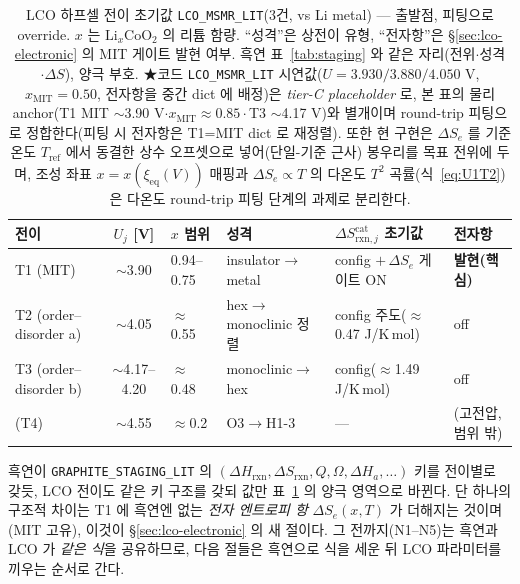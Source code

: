 \documentclass[11pt,a4paper]{article}
\newcommand{\rxn}{\mathrm{rxn}}
\newcommand{\code}[1]{\texttt{#1}}
\begin{document}
\begin{table}[t]
\centering\footnotesize
\renewcommand{\arraystretch}{1.3}
\caption{LCO 하프셀 전이 초기값 \code{LCO\_MSMR\_LIT}(3건, vs Li metal) — 출발점, 피팅으로 override. $x$ 는
$\mathrm{Li}_x\mathrm{CoO_2}$ 의 리튬 함량. ``성격''은 상전이 유형, ``전자항''은 \S\ref{sec:lco-electronic} 의 MIT
게이트 발현 여부. 흑연 표~\ref{tab:staging} 와 같은 자리(전위$\cdot$성격$\cdot\Delta S$), 양극 부호.
★코드 \code{LCO\_MSMR\_LIT} 시연값($U{=}3.930/3.880/4.050$ V, $x_\mathrm{MIT}{=}0.50$, 전자항을 중간 dict 에 배정)은
\emph{tier-C placeholder} 로, 본 표의 물리 anchor(T1 MIT $\sim$3.90 V$\cdot x_\mathrm{MIT}{\approx}0.85\cdot$T3 $\sim$4.17 V)와 별개이며
round-trip 피팅으로 정합한다(피팅 시 전자항은 T1=MIT dict 로 재정렬). 또한 현 구현은 $\Delta S_e$ 를 기준온도 $T_\mathrm{ref}$ 에서
동결한 상수 오프셋으로 넣어(단일-기준 근사) 봉우리를 목표 전위에 두며, 조성 좌표 $x{=}x(\xi_\mathrm{eq}(V))$ 매핑과
$\Delta S_e{\propto}T$ 의 다온도 $T^2$ 곡률(식~\eqref{eq:U1T2})은 다온도 round-trip 피팅 단계의 과제로 분리한다.}
\label{tab:lco-staging}
\begin{tabular}{@{}p{} c p{} p{} p{} p{}@{}}
\toprule
전이 & $U_j$ [V] & $x$ 범위 & 성격 & $\Delta S_{\rxn,j}^\mathrm{cat}$ 초기값 & 전자항 \\
\midrule
T1 (MIT)              & $\sim$3.90        & 0.94--0.75 & insulator$\to$metal       & config $+\,\Delta S_e$ 게이트 ON & \textbf{발현(핵심)} \\
T2 (order--disorder a)& $\sim$4.05        & $\approx$0.55 & hex$\to$monoclinic 정렬 & config 주도($\approx$0.47 J/K\,mol) & off \\
T3 (order--disorder b)& $\sim$4.17--4.20  & $\approx$0.48 & monoclinic$\to$hex      & config($\approx$1.49 J/K\,mol) & off \\
\midrule
(T4)                  & $\sim$4.55        & $\approx$0.2 & O3$\to$H1-3              & --- & (고전압, 범위 밖) \\
\bottomrule
\end{tabular}
\end{table}

흑연이 \code{GRAPHITE\_STAGING\_LIT} 의 $(\Delta H_\rxn,\Delta S_\rxn,Q,\Omega,\Delta H_a,\dots)$ 키를 전이별로 갖듯,
LCO 전이도 같은 키 구조를 갖되 값만 표~\ref{tab:lco-staging} 의 양극 영역으로 바뀐다. 단 하나의 구조적 차이는 T1 에
흑연엔 없는 \emph{전자 엔트로피 항} $\Delta S_e(x,T)$ 가 더해지는 것이며(MIT 고유), 이것이 \S\ref{sec:lco-electronic}
의 새 절이다. 그 전까지(N1--N5)는 흑연과 LCO 가 \emph{같은 식}을 공유하므로, 다음 절들은 흑연으로 식을 세운 뒤 LCO
파라미터를 끼우는 순서로 간다.
\end{document}
